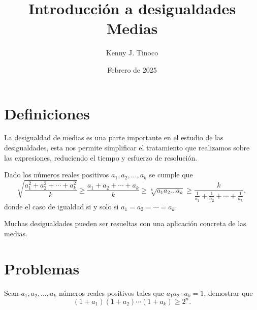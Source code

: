 \documentclass[12pt]{article}
\title{Introducción a desigualdades\\Medias}
\author{Kenny J. Tinoco}
\date{Febrero de 2025}
\begin{document}
    \maketitle

    \section{Definiciones}

    La desigualdad de medias es una parte importante en el estudio de las desigualdades, esta nos permite
    simplificar el tratamiento que realizamos sobre las expresiones, reduciendo el tiempo y esfuerzo de resolución.

    \begin{theorem}
        Dado los números reales positivos $a_1, a_2, \ldots , a_k$ se cumple que
        \[
            \sqrt {\frac{a_1^2 + a_2^2 + \cdots + a_k^2}{k}} \geq \frac{a_1 + a_2 + \cdots + a_k}{k} \geq \sqrt[k]{a_1 a_2 \ldots a_k} \geq \frac{k}{\frac{1}{a_1} + \frac{1}{a_2} + \cdots + \frac{1}{a_k}},
        \]
        donde el caso de igualdad si y solo si $a_1 = a_2 = \cdots = a_k$.
    \end{theorem}

    Muchas desigualdades pueden ser resueltas con una aplicación concreta de las medias.

    \section{Problemas}

    \begin{prob-without-section}
        Sean $a_1, a_2, \ldots, a_k$ números reales positivos tales que $a_1 a_2 \cdot a_k = 1$, demostrar que
        \[
            (1 + a_1)(1 + a_2) \cdots (1 + a_k) \geq 2^n.
        \]
    \end{prob-without-section}
\end{document}
